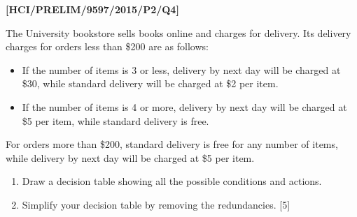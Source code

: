 \item \textbf{{[}HCI/PRELIM/9597/2015/P2/Q4{]} }

The University bookstore sells books online and charges for delivery.
Its delivery charges for orders less than \$200 are as follows: 
\begin{itemize}
\item If the number of items is 3 or less, delivery by next day will be
charged at \$30, while standard delivery will be charged at \$2 per
item. 
\item If the number of items is 4 or more, delivery by next day will be
charged at \$5 per item, while standard delivery is free. 
\end{itemize}
For orders more than \$200, standard delivery is free for any number
of items, while delivery by next day will be charged at \$5 per item. 
\begin{enumerate}
\item Draw a decision table showing all the possible conditions and actions. 
\item Simplify your decision table by removing the redundancies. \hfill{}{[}5{]}
\end{enumerate}